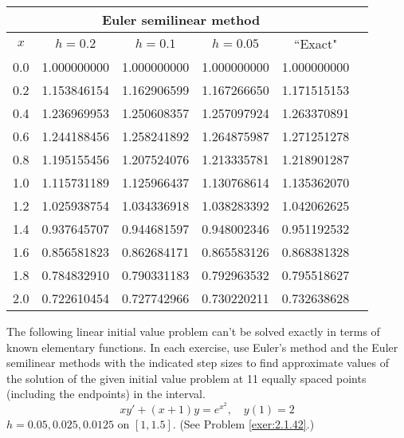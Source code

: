 \documentclass{ximera}
\begin{document}
\begin{problem}
\begin{solution}
{\small
\begin{tabular}{|c|r|r|r|r|r|}
\hline
\multicolumn{5}{|c|}{Euler semilinear method}\\\hline
\multicolumn{1}{|c|}{$x$}&
\multicolumn{1}{|c|}{$h=0.2$}&
\multicolumn{1}{|c|}{$h=0.1$}&
\multicolumn{1}{|c|}{$h=0.05$}&
\multicolumn{1}{|c|}{``Exact"}\\ \hline
0.0 & 1.000000000 & 1.000000000 & 1.000000000 & 1.000000000 \\
0.2 & 1.153846154 & 1.162906599 & 1.167266650 & 1.171515153 \\
0.4 & 1.236969953 & 1.250608357 & 1.257097924 & 1.263370891 \\
0.6 & 1.244188456 & 1.258241892 & 1.264875987 & 1.271251278 \\
0.8 & 1.195155456 & 1.207524076 & 1.213335781 & 1.218901287 \\
1.0 & 1.115731189 & 1.125966437 & 1.130768614 & 1.135362070 \\
1.2 & 1.025938754 & 1.034336918 & 1.038283392 & 1.042062625 \\
1.4 & 0.937645707 & 0.944681597 & 0.948002346 & 0.951192532 \\
1.6 & 0.856581823 & 0.862684171 & 0.865583126 & 0.868381328 \\
1.8 & 0.784832910 & 0.790331183 & 0.792963532 & 0.795518627 \\
2.0 & 0.722610454 & 0.727742966 & 0.730220211 & 0.732638628 \\
\hline
\end{tabular}}
\end{solution}
\end{problem}

\begin{problem}\label{exer:3.1.19} The following linear initial value problem can't be solved exactly in terms of known elementary functions. In each exercise, use
Euler's method and the Euler semilinear methods
with the indicated step sizes to find approximate values of the
solution of the given initial value problem at 11 equally spaced
points (including the endpoints) in the interval.
$$xy'+(x+1)y=e^{x^2},\quad y(1)=2$$
$h=0.05,0.025,0.0125$ on $[1,1.5]$. (See Problem \ref{exer:2.1.42}.)
\end{problem}
\end{document}
